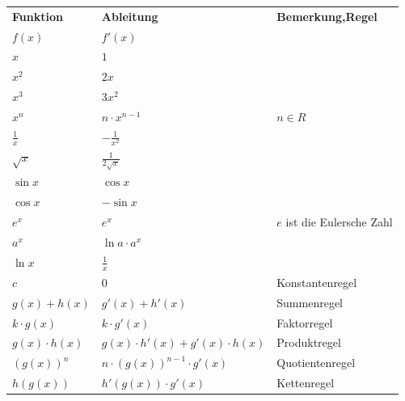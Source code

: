\documentclass[a4paper,12pt]{article}
\begin{document}
\bgroup
\def\arraystretch{1.5}%
\begin{tabular}{p{5cm}|p{5cm}|p{5cm}}
  {\bf Funktion} & {\bf Ableitung} & {\bf Bemerkung,Regel}\\
  $f(x)$ & $f'(x)$ & \\
  \hline
  $x$ & $1$ & \\
  $x^2$ & $2x$ & \\
  $x^3$ & $3x^2$ & \\
  $x^n$ & $n\cdot x^{n-1}$ & $n \in R$ \\
  $\frac{1}{x}$ & $-\frac{1}{x^2}$ & \\
  $\sqrt{x}$ & $\frac{1}{2\sqrt{x}}$ & \\
  $\sin{x}$ & $\cos{x}$ & \\
  $\cos{x}$ & $-\sin{x}$ & \\
  $e^x$ & $e^x$ & $e$ ist die Eulersche Zahl \\
  $a^x$ & $\ln{a}\cdot a^x$ & \\
  $\ln{x}$ & $\frac{1}{x}$ & \\
  \hline
  $c$ & $0$ & Konstantenregel \\
  $g(x)+h(x)$ & $g'(x)+h'(x)$ & Summenregel \\
  $k \cdot g(x)$ & $k \cdot g'(x)$ & Faktorregel \\
  $g(x)\cdot h(x)$ & $g(x) \cdot h'(x) + g'(x)\cdot h(x)$ & Produktregel \\
  $(g(x))^n$ & $n \cdot (g(x))^{n-1} \cdot g'(x)$ & Quotientenregel \\
  $h(g(x))$ & $h'(g(x)) \cdot g'(x)$ & Kettenregel \\
\end{tabular}
\egroup

\newpage
\end{document}

